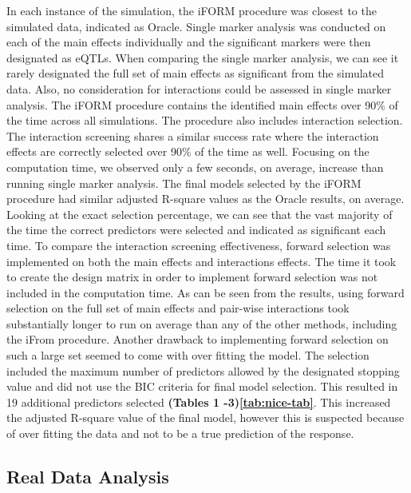 \documentclass[]{book}
\theoremstyle{definition}
\theoremstyle{definition}
\theoremstyle{remark}
\begin{document}
In each instance of the simulation, the iFORM procedure was closest to
the simulated data, indicated as Oracle. Single marker analysis was
conducted on each of the main effects individually and the significant
markers were then designated as eQTLs. When comparing the single marker
analysis, we can see it rarely designated the full set of main effects
as significant from the simulated data. Also, no consideration for
interactions could be assessed in single marker analysis. The iFORM
procedure contains the identified main effects over 90\% of the time
across all simulations. The procedure also includes interaction
selection. The interaction screening shares a similar success rate where
the interaction effects are correctly selected over 90\% of the time as
well. Focusing on the computation time, we observed only a few seconds,
on average, increase than running single marker analysis. The final
models selected by the iFORM procedure had similar adjusted R-square
values as the Oracle results, on average. Looking at the exact selection
percentage, we can see that the vast majority of the time the correct
predictors were selected and indicated as significant each time. To
compare the interaction screening effectiveness, forward selection was
implemented on both the main effects and interactions effects. The time
it took to create the design matrix in order to implement forward
selection was not included in the computation time. As can be seen from
the results, using forward selection on the full set of main effects and
pair-wise interactions took substantially longer to run on average than
any of the other methods, including the iFrom procedure. Another
drawback to implementing forward selection on such a large set seemed to
come with over fitting the model. The selection included the maximum
number of predictors allowed by the designated stopping value and did
not use the BIC criteria for final model selection. This resulted in 19
additional predictors selected \textbf{(Tables 1 -3)\ref{tab:nice-tab}}.
This increased the adjusted R-square value of the final model, however
this is suspected because of over fitting the data and not to be a true
prediction of the response.

\subsection{Real Data Analysis}\label{real-data-analysis}
\end{document}
